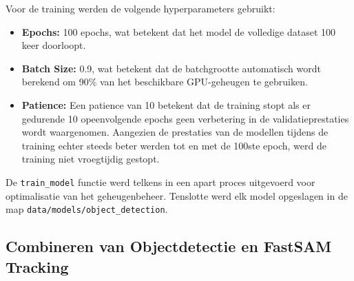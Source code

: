 Voor de training werden de volgende hyperparameters gebruikt:
\begin{itemize}
    \item \textbf{Epochs:} 100 epochs, wat betekent dat het model de volledige dataset 100 keer doorloopt.
    \item \textbf{Batch Size:} 0.9, wat betekent dat de batchgrootte automatisch wordt berekend om 90\% van het beschikbare GPU-geheugen te gebruiken. 
    \item \textbf{Patience:} Een patience van 10 betekent dat de training stopt als er gedurende 10 opeenvolgende epochs geen verbetering in de validatieprestaties wordt waargenomen.
    Aangezien de prestaties van de modellen tijdens de training echter steeds beter werden tot en met de 100ste epoch, werd de training niet vroegtijdig gestopt.
\end{itemize}
De \texttt{train\_model} functie werd telkens in een apart proces uitgevoerd voor optimalisatie van het geheugenbeheer.
Tenslotte werd elk model opgeslagen in de map \texttt{data/models/object\_detection}.

\subsection{Combineren van Objectdetectie en FastSAM Tracking}

